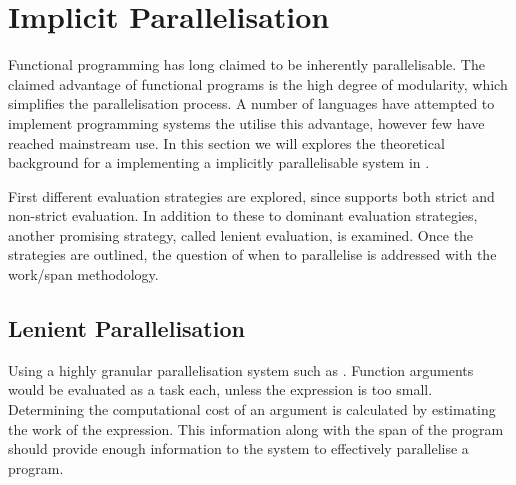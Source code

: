 \section{Implicit Parallelisation}\label{sec:implicit-para}
Functional programming has long claimed to be inherently parallelisable\cite{hudak1986functional, loidl1998granularity}. The claimed advantage of functional programs is the high degree of modularity, which simplifies the parallelisation process. A number of languages have attempted to implement programming systems the utilise this advantage, however few have reached mainstream use. In this section we will explores the theoretical background for a implementing a implicitly parallelisable system in \fs.

First different evaluation strategies are explored, since \fs supports both strict and non-strict evaluation. In addition to these to dominant evaluation strategies, another promising strategy, called lenient evaluation, is examined. Once the strategies are outlined, the question of when to parallelise is addressed with the work/span methodology.




\subsection{Lenient Parallelisation}
Using a highly granular parallelisation system such as  . Function arguments would be evaluated as a task each, unless the expression is too small. Determining the computational cost of an argument is calculated by estimating the work of the expression. This information along with the span of the program should provide enough information to the system to effectively parallelise a \fs program.

